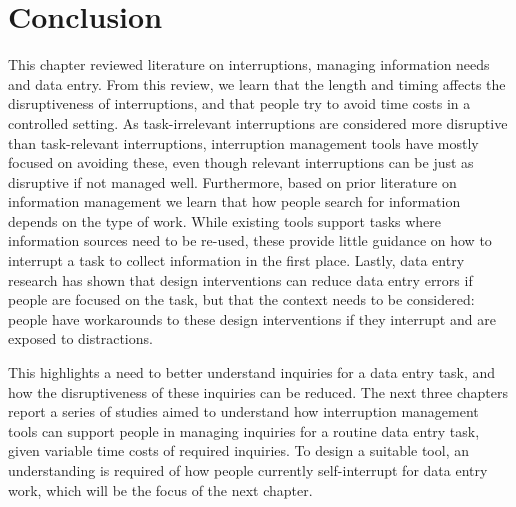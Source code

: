 \section{Conclusion}
This chapter reviewed literature on interruptions, managing information needs and data entry. From this review, we learn that the length and timing affects the disruptiveness of interruptions, and that people try to avoid time costs in a controlled setting. As task-irrelevant interruptions are considered more disruptive than task-relevant interruptions, interruption management tools have mostly focused on avoiding these, even though relevant interruptions can be just as disruptive if not managed well. Furthermore, based on prior literature on information management we learn that how people search for information depends on the type of work. While existing tools support tasks where information sources need to be re-used, these provide little guidance on how to interrupt a task to collect information in the first place. Lastly, data entry research has shown that design interventions can reduce data entry errors if people are focused on the task, but that the context needs to be considered: people have workarounds to these design interventions if they interrupt and are exposed to distractions.

This highlights a need to better understand inquiries for a data entry task, and how the disruptiveness of these inquiries can be reduced. The next three chapters report a series of studies aimed to understand how interruption management tools can support people in managing inquiries for a routine data entry task, given variable time costs of required inquiries. To design a suitable tool, an understanding is required of how people currently self-interrupt for data entry work, which will be the focus of the next chapter.



